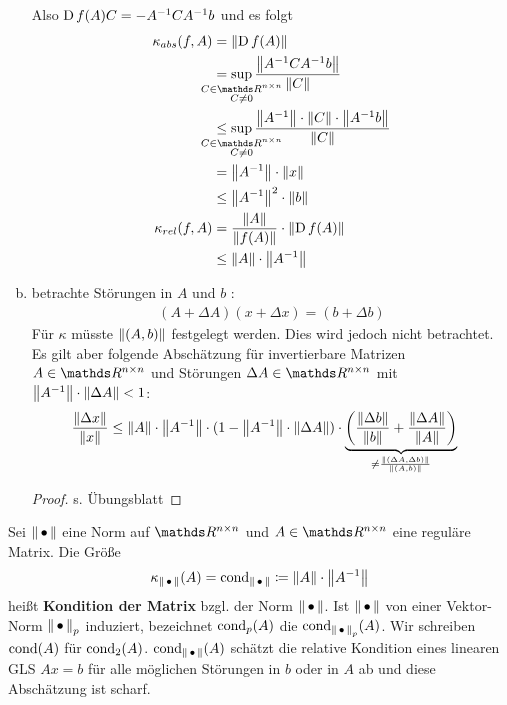 \begin{Bspe}
\begin{enumerate}[a)]
    Also $\D f(A) C = -A^{-1}CA^{-1}b$ und es folgt
    \begin{align}
      \nonumber
      \kappa_{abs} (f,A) 
      &= \nn[\D f(A)] \\ \nonumber
      &= \sup_{\mathclap{\substack{
        C \in \R^{n\times n} \\
      C\neq 0								  	
      }}}
      \frac{\nn[A^{-1}CA^{-1}b]}{\nn[C]} \\ \nonumber
      &\leq \sup_{\mathclap{\substack{ 
        C \in \R^{n\times n}\\
      C \neq 0
      }}}
      \frac{\nn[A^{-1}]\cdot\nn[C]\cdot\nn[A^{-1}b]}{\nn[C]} \\ \nonumber
      &= \nn[A^{-1}] \cdot\nn[x] \\ \nonumber
      &\leq   \nn[A^{-1}]^2 \cdot\nn[b] \\ \nonumber
      \kappa_{rel}(f,A)  &= \frac{\nn[A]}{\nn[f(A)]} \cdot \nn[\D f(A)] \\
      &\leq \nn[A]\cdot \nn[A^{-1}] \label{III.2.10}
    \end{align}
  \item betrachte Störungen in $A$ und $b$ :
    \begin{gather*}
      (A+\Delta A)(x+\Delta x) = (b+\Delta b) 
    \end{gather*}
    Für $\kappa$ müsste $\nn[(A,b)]$ festgelegt werden. 
    Dies wird jedoch nicht betrachtet. 
    Es gilt aber folgende Abschätzung 
    für invertierbare Matrizen $A\in \Renn $ 
    und Störungen $\Delta A \in \R^{n\times n}$ 
    mit $\nn[A^{-1}]\cdot \nn[\Delta A] < 1$:
    \begin{align}
      \frac{\nn[\Delta x]}{\nn[x]} 
      & \leq \nn[A] \cdot \nn[A^{-1}]\cdot (1- \nn[A^{-1}]\cdot \nn[\Delta A]) 
        \cdot
        \underbrace{\left(  
        \frac{\nn[\Delta b]}{\nn[b]} + \frac{\nn[\Delta A]}{\nn[A]}  
        \right)}_{
        \neq  \frac{\nn[(\Delta A, \Delta b)]}{\nn[(A,b)]} 
        }
        \label{III.2.11}
    \end{align}
    \begin{proof} s. Übungsblatt \end{proof}
  \end{enumerate}
\end{Bspe}

\begin{Defe}
  Sei $\nn$ eine Norm auf $\R^{n\times n} $ 
  und $A\in \R^{n\times n}$ eine reguläre Matrix.
  Die Größe
  \begin{gather*}
    \kappa_{\nn}(A) = \Cond_{\nn} \coloneqq \nn[A] \cdot \nn[A^{-1}]
  \end{gather*}
  heißt \textbf{Kondition der Matrix} bzgl. der Norm ${\nn}$.
  Ist  ${\nn}$ von einer Vektor-Norm ${\nn}_p$ induziert,
  bezeichnet $\Cond_p(A)$ die $\Cond_{\nn_p}(A)$. 
  Wir schreiben $\Cond(A)$ für $\Cond_2(A)$.
  $\Cond_{\nn}(A) $ schätzt die relative Kondition 
  eines linearen GLS $Ax=b$ für alle möglichen 
  Störungen in $b$ oder in $A$ ab und diese Abschätzung ist scharf.
\end{Defe}


